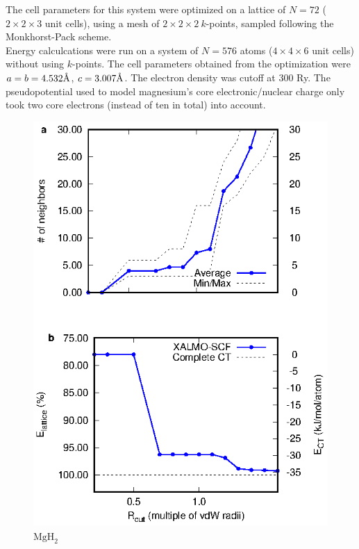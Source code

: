 \documentclass[aps,prb,twocolumn,amsmath,amssymb,superscriptaddress,longbibliography]{revtex4-1}
\newcommand{\angstrom}{\text{\normalfont\AA}}
\begin{document}
The cell parameters for this system were optimized on a lattice of $N = 72$ ($2\times 2\times 3$ unit cells), using a mesh of $2\times 2\times 2\: k$-points, sampled following the Monkhorst-Pack scheme\cite{kpts}.\\ 
Energy calculcations were run on a system of $N = 576$ atoms ($4\times 4\times 6$ unit cells) without using $k$-points.
The cell parameters obtained from the optimization were $a = b = 4.532\angstrom$, $c = 3.007\angstrom$.
The electron density was cutoff at 300 Ry. 
The pseudopotential used to model magnesium's core electronic/nuclear charge only took two core electrons (instead of ten in total) into account.
 
\begin{figure}
\includegraphics[scale=1]{plots/MgH2_EvR}
\caption{$\text{MgH}_{2}$}
\end{figure}
\end{document}

